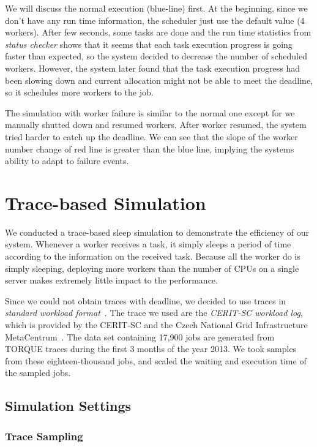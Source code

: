 We will discuss the normal execution (blue-line) first.
At the beginning, since we don't have any run time information, the
scheduler just use the default value (4 workers).
After few seconds, some tasks are done and the run time statistics from
\emph{status checker} shows that it seems that each task execution
progress is going faster than expected, so the system decided to
decrease the number of scheduled workers.
However, the system later found that the task execution progress had
been slowing down and current allocation might not be able to meet the
deadline, so it schedules more workers to the job.

The simulation with worker failure is similar to the normal one except
for we manually shutted down and resumed workers.
After worker resumed, the system tried harder to catch up the deadline.
We can see that the slope of the worker number change of red line is
greater than the blue line, implying the systems ability to adapt to
failure events.

\section{Trace-based Simulation}
We conducted a trace-based sleep simulation to demonstrate the
efficiency of our system.
Whenever a worker receives a task, it simply sleeps a period of time
according to the information on the received task.
Because all the worker do is simply sleeping, deploying more workers
than the number of CPUs on a single server makes extremely little impact
to the performance.

Since we could not obtain traces with deadline, we decided to use traces
in {\em standard workload format}~\cite{cite:swf}.
The trace we used are the \emph{CERIT-SC workload log}, which is
provided by the CERIT-SC and the Czech National Grid Infrastructure
MetaCentrum~\cite{cite:metacentrum}.
The data set containing 17,900 jobs are generated from TORQUE traces
during the first 3 months of the year 2013.
We took samples from these eighteen-thousand jobs, and scaled the
waiting and execution time of the sampled jobs.

\subsection{Simulation Settings}
\subsubsection{Trace Sampling}

